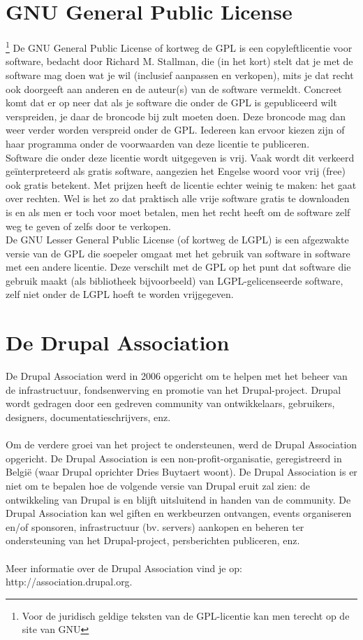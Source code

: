 \section{GNU General Public License} 
\footnote {Voor de juridisch geldige teksten van de GPL-licentie kan men terecht op de site van GNU}
De GNU General Public License of kortweg de GPL is een copyleftlicentie voor software, 
bedacht door Richard M. Stallman, die (in het kort) stelt dat je met de software mag doen 
wat je wil (inclusief aanpassen en verkopen), mits je dat recht ook doorgeeft aan anderen 
en de auteur(s) van de software vermeldt. Concreet komt dat er op neer dat als je 
software die onder de GPL is gepubliceerd wilt verspreiden, je daar de broncode bij 
zult moeten doen. Deze broncode mag dan weer verder worden verspreid onder de GPL. 
Iedereen kan ervoor kiezen zijn of haar programma onder de voorwaarden van deze licentie te publiceren.
\\
Software die onder deze licentie wordt uitgegeven is vrij. Vaak wordt dit
verkeerd ge\"interpreteerd als gratis software, aangezien het Engelse woord voor
vrij (free) ook gratis betekent. Met prijzen heeft de licentie echter weinig te maken: 
het gaat over rechten. Wel is het zo dat praktisch alle vrije software gratis te 
downloaden is en als men er toch voor moet betalen, men het recht heeft om de software 
zelf weg te geven of zelfs door te verkopen.
\\
De GNU Lesser General Public License (of kortweg de LGPL)  is een
afgezwakte versie van de GPL die soepeler omgaat met het gebruik van software in software met een andere licentie. 
Deze verschilt met de GPL op het punt dat software die gebruik maakt (als bibliotheek bijvoorbeeld) 
van LGPL-gelicenseerde software, zelf niet onder de LGPL hoeft te worden vrijgegeven.

\section{De Drupal Association}
 De Drupal Association werd in 2006 opgericht om te helpen met het beheer van de
 infrastructuur, fondsenwerving en promotie van het Drupal-project. Drupal wordt gedragen door een 
 gedreven community van ontwikkelaars, gebruikers, designers,
 documentatieschrijvers, enz.\\
\\
Om de verdere groei van het project te ondersteunen, werd de Drupal Association
opgericht. De Drupal Association is een non-profit-organisatie, geregistreerd in
Belgi\"e (waar Drupal oprichter Dries Buytaert woont). De Drupal Association is
er niet om te bepalen hoe de volgende versie van Drupal eruit zal zien: de ontwikkeling van Drupal is en blijft uitsluitend 
in handen van de community. De Drupal Association kan wel giften en werkbeurzen ontvangen, 
events organiseren en/of sponsoren, infrastructuur (bv. servers) aankopen en beheren ter ondersteuning 
van het Drupal-project, persberichten publiceren, enz.\\
\\
Meer informatie over de Drupal Association vind je op:
http://association.drupal.org.